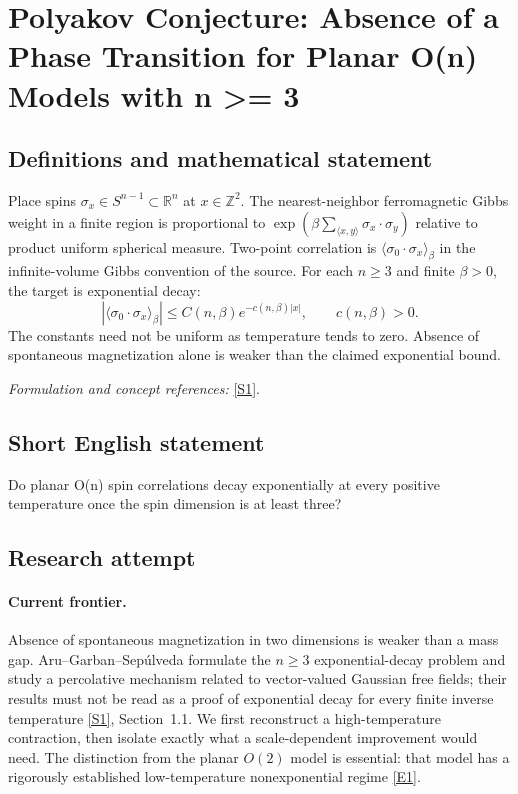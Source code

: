 \documentclass[11pt,a4paper]{article}
\newcommand{\Z}{\mathbb{Z}}
\newcommand{\R}{\mathbb{R}}
\newcommand{\sref}[2]{\hyperlink{source:#1:#2}{[S#2]}}
\newcommand{\eref}[2]{\hyperlink{extra:#1:#2}{[E#2]}}
\newif\ifshowcatalogue
\newcommand{\cataloguescope}[1]{\ifshowcatalogue
 \paragraph{Exact scope in the supplied catalogue.}
 \begin{quote}\small #1\end{quote}\fi}
\numberwithin{equation}{section}
\begin{document}
\setcounter{section}{0}
\clearpage
\section*{\texorpdfstring{Polyakov Conjecture: Absence of a Phase Transition for Planar O(n) Models with n >= 3}{Polyakov Conjecture: Absence of a Phase Transition for Planar O(n) Models with n >= 3}}\label{statement}
\subsection{Definitions and mathematical statement}
Place spins $\sigma_x\in S^{n-1}\subset\R^n$ at $x\in\Z^2$. The nearest-neighbor ferromagnetic Gibbs weight in a finite region is proportional to
$\exp(\beta\sum_{\langle x,y\rangle}\sigma_x\cdot\sigma_y)$ relative to product uniform spherical measure. Two-point correlation is $\langle\sigma_0\cdot\sigma_x\rangle_\beta$ in the infinite-volume Gibbs convention of the source. For each $n\ge3$ and finite $\beta>0$, the target is exponential decay:
\[
 |\langle\sigma_0\cdot\sigma_x\rangle_\beta|\le C(n,\beta)e^{-c(n,\beta)|x|},
 \qquad c(n,\beta)>0.
\]
The constants need not be uniform as temperature tends to zero. Absence of spontaneous magnetization alone is weaker than the claimed exponential bound.
\par\smallskip\textit{Formulation and concept references:} \sref{statement}{1}.
\cataloguescope{For every integer n >= 3 and every finite inverse temperature beta > 0, prove that two-point correlations in the nearest-neighbor O(n) spin model on Z\textasciicircum{}2 decay exponentially with distance.}
\subsection{Short English statement}
Do planar O(n) spin correlations decay exponentially at every positive temperature once the spin dimension is at least three?
\subsection{Research attempt}

\paragraph{Current frontier.}
Absence of spontaneous magnetization in two dimensions is weaker than a mass gap. Aru--Garban--Sep\'ulveda formulate the $n\ge3$ exponential-decay problem and study a percolative mechanism related to vector-valued Gaussian free fields; their results must not be read as a proof of exponential decay for every finite inverse temperature \sref{statement}{1}, Section~1.1. We first reconstruct a high-temperature contraction, then isolate exactly what a scale-dependent improvement would need. The distinction from the planar $O(2)$ model is essential: that model has a rigorously established low-temperature nonexponential regime \eref{statement}{1}.
\end{document}
